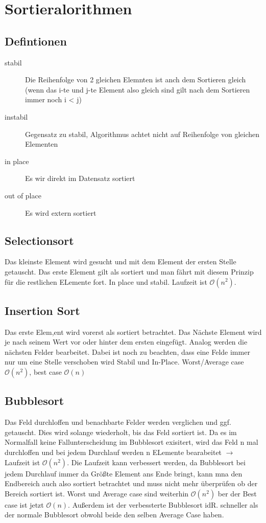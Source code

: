 \documentclass[a4paper]{scrartcl}
\begin{document}
    \section{Sortieralorithmen}
    \subsection{Defintionen}
        \begin{description}
            \item[stabil] Die Reihenfolge von 2 gleichen Elemnten ist anch dem Sortieren gleich (wenn das i-te und j-te Element also gleich sind gilt nach dem Sortieren immer noch i < j)
            \item[instabil] Gegensatz zu stabil, Algorithmus achtet nicht auf Reihenfolge von gleichen Elementen
            \item[in place] Es wir direkt im Datensatz sortiert
            \item[out of place] Es wird extern sortiert  
        \end{description}
    
        \subsection{Selectionsort}
            Das kleinste Element wird gesucht und mit dem Element der ersten Stelle getauscht. Das erste Element gilt als sortiert und man fährt mit diesem Prinzip
            für die restlichen ELemente fort. In place und stabil. Laufzeit ist \(\mathcal{O}(n^2)\).
        \subsection{Insertion Sort} 
            Das erste Elem,ent wird vorerst als sortiert betrachtet. Das Nächste Element wird je nach seinem Wert vor oder hinter dem ersten eingefügt. Analog werden die nächsten
            Felder bearbeitet. Dabei ist noch zu beachten, dass eine Felde immer nur um eine Stelle verschoben wird
            Stabil und In-Place. Worst/Average case \(\mathcal{O}(n^2)\), best case \(\mathcal{O}(n)\)
        \subsection{Bubblesort}
            Das Feld durchloffen und benachbarte Felder werden verglichen und ggf. getauscht. Dies wird solange wiederholt, bis das Feld sortiert ist. Da es im Normalfall
            keine Fallunterscheidung im Bubblesort exisitert, wird das Feld n mal durchloffen und bei jedem Durchlauf werden n ELemente bearabeitet \(\rightarrow\) 
            Laufzeit ist \(\mathcal{O}(n^2)\). Die Laufzeit kann verbessert werden, da Bubblesort bei jedem Durchlauf immer da Größte Element ans Ende bringt, 
            kann mna den Endbereich auch also sortiert betrachtet und muss nicht mehr überprüfen ob der Bereich sortiert ist.  Worst und Average case sind weiterhin
            \(\mathcal{O}(n^2)\) ber der Best case ist jetzt \(\mathcal{O}(n)\). Außerdem ist der verbessterte Bubblesort idR. schneller als der normale Bubblesort
            obwohl beide den selben Average Case haben.
\end{document}
